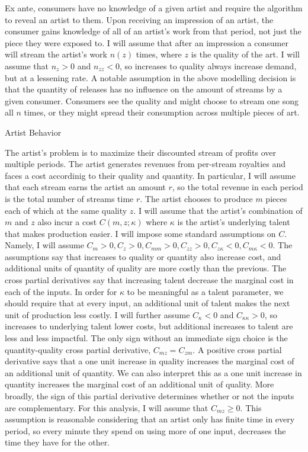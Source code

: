 \documentclass[
]{article}
\begin{document}
Ex ante, consumers have no knowledge of a given artist and require the
algorithm to reveal an artist to them. Upon receiving an impression of
an artist, the consumer gains knowledge of all of an artist's work from
that period, not just the piece they were exposed to. I will assume that
after an impression a consumer will stream the artist's work \(n(z)\)
times, where \(z\) is the quality of the art. I will assume that
\(n_z>0\) and \(n_{zz}<0\), so increases to quality always increase
demand, but at a lessening rate. A notable assumption in the above
modelling decision is that the quantity of releases has no influence on
the amount of streams by a given consumer. Consumers see the quality and
might choose to stream one song all \(n\) times, or they might spread
their consumption across multiple pieces of art.

Artist Behavior

The artist's problem is to maximize their discounted stream of profits
over multiple periods. The artist generates revenues from per-stream
royalties and faces a cost accordinig to their quality and quantity. In
particular, I will assume that each stream earns the artist an amount
\(r\), so the total revenue in each period is the total number of
streams time \(r\). The artist chooses to produce \(m\) pieces each of
which at the same quality \(z\). I will assume that the artist's
combination of \(m\) and \(z\) also incur a cost \(C(m,z;\kappa)\) where
\(\kappa\) is the artist's underlying talent that makes production
easier. I will impose some standard assumptions on \(C\). Namely, I will
assume \(C_m>0,C_z>0,C_{mm}>0,C_{zz}>0,C_{z\kappa}<0,C_{m\kappa}<0\).
The assumptions say that increases to quality or quantity also increase
cost, and additional units of quantity of quality are more costly than
the previous. The cross partial derivatives say that increasing talent
decrease the marginal cost in each of the inputs. In order for
\(\kappa\) to be meaningful as a talent parameter, we should require
that at every input, an additional unit of talent makes the next unit of
production less costly. I will further assume \(C_\kappa<0\) and
\(C_{\kappa\kappa}>0\), so increases to underlying talent lower costs,
but additional increases to talent are less and less impactful. The only
sign without an immediate sign choice is the quantity-quality cross
partial derivative, \(C_{mz}=C_{zm}\). A positive cross partial
derivative says that a one unit increase in quality increases the
marginal cost of an additional unit of quantity. We can also interpret
this as a one unit increase in quantity increases the marginal cost of
an additional unit of quality. More broadly, the sign of this partial
derivative determines whether or not the inputs are complementary. For
this analysis, I will assume that \(C_{mz}\geq 0\). This assumption is
reasonable considering that an artist only has finite time in every
period, so every minute they spend on using more of one input, decreases
the time they have for the other.
\end{document}
